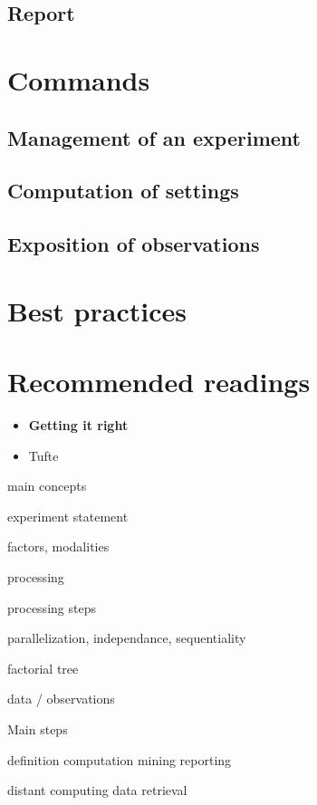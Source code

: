 \documentclass[10pt,a4paper,fleqn]{article}
\begin{document}
\subsection{Report}

\section{Commands}

\subsection{Management of an experiment}

\subsection{Computation of settings}

\subsection{Exposition of observations}

\section{Best practices}

\section{Recommended readings}

\begin{itemize}


\item \textbf{Getting it right}

\item \textbf{} Tufte

\end{itemize}







main concepts

experiment statement

factors, modalities

processing

processing steps

parallelization, independance, sequentiality

factorial tree

data / observations

Main steps

definition
computation
mining
reporting

distant computing
data retrieval
\end{document}
